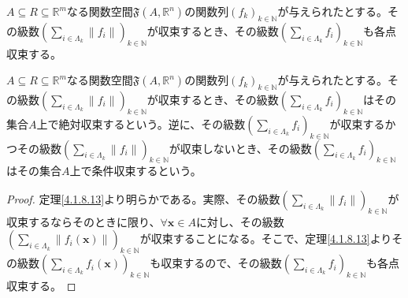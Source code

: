 \documentclass[dvipdfmx]{jsarticle}
\begin{document}
\begin{thm}\label{4.1.11.5}
$A \subseteq R \subseteq \mathbb{R}^{m}$なる関数空間$\mathfrak{F}\left( A,\mathbb{R}^{n} \right)$の関数列$\left( f_{k} \right)_{k \in \mathbb{N}}$が与えられたとする。その級数$\left( \sum_{i \in \varLambda_{k}} \left\| f_{i} \right\| \right)_{k \in \mathbb{N}}$が収束するとき、その級数$\left( \sum_{i \in \varLambda_{k}} f_{i} \right)_{k \in \mathbb{N}}$も各点収束する。
\end{thm}
\begin{dfn}
$A \subseteq R \subseteq \mathbb{R}^{m}$なる関数空間$\mathfrak{F}\left( A,\mathbb{R}^{n} \right)$の関数列$\left( f_{k} \right)_{k \in \mathbb{N}}$が与えられたとする。その級数$\left( \sum_{i \in \varLambda_{k}} \left\| f_{i} \right\| \right)_{k \in \mathbb{N}}$が収束するとき、その級数$\left( \sum_{i \in \varLambda_{k}} f_{i} \right)_{k \in \mathbb{N}}$はその集合$A$上で絶対収束するという。逆に、その級数$\left( \sum_{i \in \varLambda_{k}} f_{i} \right)_{k \in \mathbb{N}}$が収束するかつその級数$\left( \sum_{i \in \varLambda_{k}} \left\| f_{i} \right\| \right)_{k \in \mathbb{N}}$が収束しないとき、その級数$\left( \sum_{i \in \varLambda_{k}} f_{i} \right)_{k \in \mathbb{N}}$はその集合$A$上で条件収束するという。
\end{dfn}
\begin{proof} 定理\ref{4.1.8.13}より明らかである。実際、その級数$\left( \sum_{i \in \varLambda_{k}} \left\| f_{i} \right\| \right)_{k \in \mathbb{N}}$が収束するならそのときに限り、$\forall\mathbf{x} \in A$に対し、その級数$\left( \sum_{i \in \varLambda_{k}} \left\| f_{i}\left( \mathbf{x} \right) \right\| \right)_{k \in \mathbb{N}}$が収束することになる。そこで、定理\ref{4.1.8.13}よりその級数$\left( \sum_{i \in \varLambda_{k}} {f_{i}\left( \mathbf{x} \right)} \right)_{k \in \mathbb{N}}$も収束するので、その級数$\left( \sum_{i \in \varLambda_{k}} f_{i} \right)_{k \in \mathbb{N}}$も各点収束する。
\end{proof}
\end{document}
